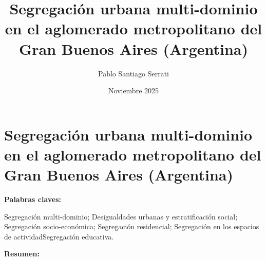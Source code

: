 \documentclass[
  spanish,
  a4paper,%
  chapterprefix=true,%
  DIV=calc,%
  twoside]{scrbook}%
\title{Segregación urbana multi-dominio en el aglomerado metropolitano del Gran Buenos Aires (Argentina)}
\author{Pablo Santiago Serrati}
\date{Noviembre 2025}
\begin{document}
\maketitle

\cfoot{\pagemark}           %

\section*{Segregación urbana multi-dominio en el aglomerado metropolitano del Gran Buenos Aires (Argentina)}

\textbf{Palabras claves:}

Segregación multi-dominio;
Desigualdades urbanas y estratificación social;
Segregación socio-económica;
Segregación residencial;
Segregación en los espacios de actividadSegregación educativa.


\textbf{Resumen:}
\end{document}
